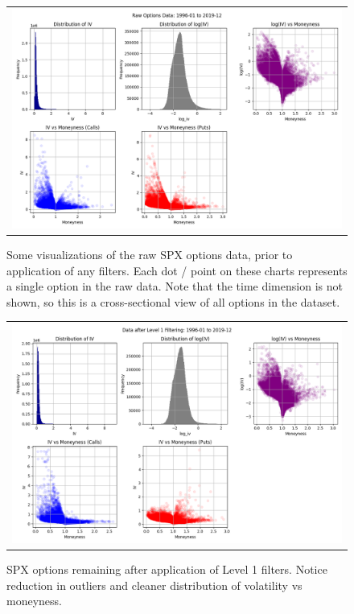 \documentclass{article}
\begin{document}
\begin{appendices}
\begin{figure}[H]
  \centering
  \begin{tabular}{@{}c@{}}
    \includegraphics[width=\linewidth,height=0.666\linewidth]{../docs_src/RAW_1996-01_2019-12_iv.png}
  \end{tabular}
  \caption{Some visualizations of the raw SPX options data, prior to application of any filters. Each dot / point on these charts represents a single option in the raw data. Note that the time dimension is not shown, so this is a cross-sectional view of all options in the dataset.}
  \label{fig:raw_spx_options_data}
\end{figure}

\begin{figure}[H]
  \centering
  \begin{tabular}{@{}c@{}}
    \includegraphics[width=\linewidth,height=0.666\linewidth]{../docs_src/L1_1996-01_2019-12_iv.png}
  \end{tabular}
  \caption{SPX options remaining after application of Level 1 filters. Notice reduction in outliers and cleaner distribution of volatility vs moneyness.}
  \label{fig:l1_spx_options_data}
\end{figure}



\end{appendices}
\end{document}
